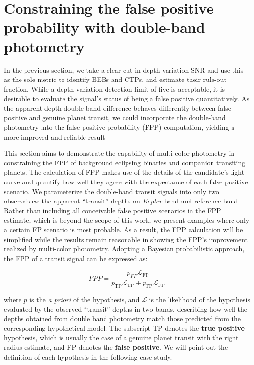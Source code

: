 \documentclass{aastex63}
\begin{document}
\section{Constraining the false positive probability with double-band photometry}
\label{sec:reducefpp}

In the previous section, we take a clear cut in depth variation SNR and use this as the sole metric to identify BEBs and CTPs, and estimate their rule-out fraction. While a depth-variation detection limit of five is acceptable, it is desirable to evaluate the signal's status of being a false positive quantitatively. As the apparent depth double-band difference behaves differently between false positive and genuine planet transit, we could incorporate the double-band photometry into the false positive probability (FPP) computation, yielding a more improved and reliable result. 

This section aims to demonstrate the capability of multi-color photometry in constraining the FPP of background eclipsing binaries and companion transiting planets. The calculation of FPP makes use of the details of the candidate's light curve and quantify how well they agree with the expectance of each false positive scenario. We parameterize the double-band transit signals into only two observables: the apparent ``transit'' depths on \emph{Kepler} band and reference band. Rather than including all conceivable false positive scenarios in the FPP estimate, which is beyond the scope of this work, we present examples where only a certain FP scenario is most probable. As a result, the FPP calculation will be simplified while the results remain reasonable in showing the FPP's improvement realized by multi-color photometry. Adopting a Bayesian probabilistic approach, the FPP of a transit signal can be expressed as:

\begin{equation}
\label{eq:fpp}
       FPP = \frac{p_{FP} \mathcal{L}_\mathrm{FP}}{p_\mathrm{TP}\mathcal{L}_\mathrm{TP}+p_\mathrm{FP} \mathcal{L}_\mathrm{FP}}  
\end{equation}

where $p$ is the \emph{a priori} of the hypothesis, and $\mathcal{L}$ is the likelihood of the hypothesis evaluated by the observed ``transit'' depths in two bands, describing how well the depths obtained from double band photometry match those predicted from the corresponding hypothetical model. The subscript TP denotes the \textbf{true positive} hypothesis, which is usually the case of a genuine planet transit with the right radius estimate, and FP denotes the \textbf{false positive}. We will point out the definition of each hypothesis in the following case study.
\end{document}
